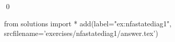 
\begin{ex} 
  \label{ex:nfastatediag1}
  
  \qed
\end{ex} 
\begin{python0}
from solutions import *
add(label="ex:nfastatediag1",
    srcfilename='exercises/nfastatediag1/answer.tex') 
\end{python0}
